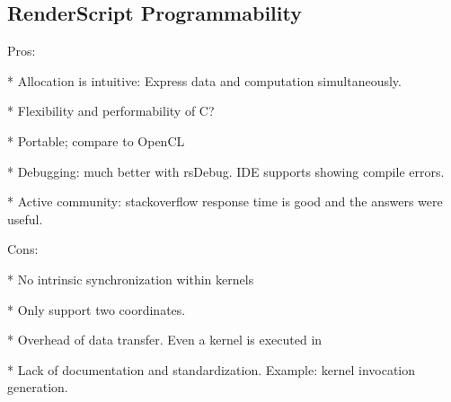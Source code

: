 \subsection{RenderScript Programmability}
Pros:

* Allocation is intuitive: Express data and computation simultaneously.

* Flexibility and performability of C?

* Portable; compare to OpenCL

* Debugging: much better with rsDebug. IDE supports showing compile errors.

* Active community: stackoverflow response time is good and the answers were useful.

Cons:

* No intrinsic synchronization within kernels

* Only support two coordinates.

* Overhead of data transfer. Even a kernel is executed in 

* Lack of documentation and standardization. Example: kernel invocation generation.


